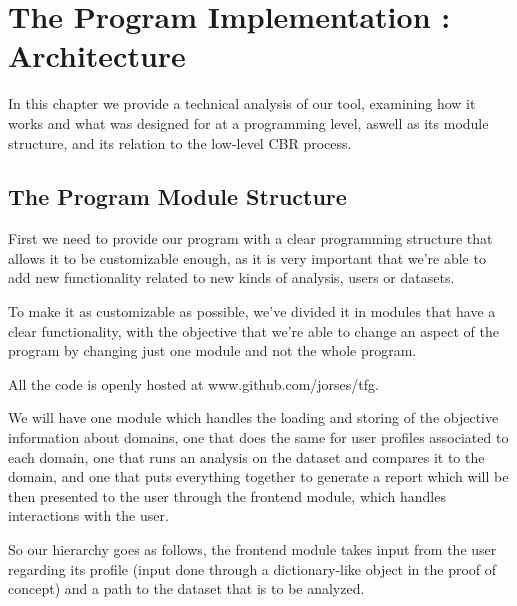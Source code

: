 %
%

\chapter{The Program Implementation : Architecture}


\begin{resumen}
In this chapter we provide a technical analysis of our tool, examining how it works and what was designed for at a programming level, aswell as its module structure, and its relation to the low-level CBR process.
\end{resumen}

\linespread{1.6}

\section{The Program Module Structure}

First we need to provide our program with a clear programming structure that allows it to be customizable enough, as it is very important that we're able to add new functionality related to new kinds of analysis, users or datasets.

To make it as customizable as possible, we've divided it in modules that have a clear functionality, with the objective that we're able to change an aspect of the program by changing just one module and not the whole program.

All the code is openly hosted at www.github.com/jorses/tfg.

We will have one module which handles the loading and storing of the objective information about domains, one that does the same for user profiles associated to each domain, one that runs an analysis on the dataset and compares it to the domain, and one that puts everything together to generate a report which will be then presented to the user through the frontend module, which handles interactions with the user.

So our hierarchy goes as follows, the frontend module takes input from the user regarding its profile (input done through a dictionary-like object in the proof of concept) and a path to the dataset that is to be analyzed.

